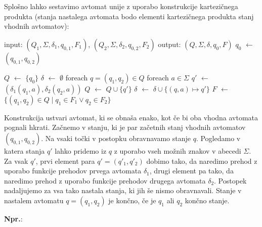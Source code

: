 \documentclass{article}
\newcommand{\Ex}{\textbf{Npr.}:\ }
\begin{document}
Splošno lahko sestavimo avtomat unije z uporabo konstrukcije kartezičnega produkta (stanja nastalega avtomata bodo elementi kartezičnega produkta stanj vhodnih avtomatov):
\begin{algorithm}
  input: $(Q_1, \Sigma, \delta_1, q_{0,1}, F_1)$, $(Q_2, \Sigma, \delta_2, q_{0,2}, F_2)$
  output: $(Q, \Sigma, \delta, q_{0}, F)$
  $q_0$ $\gets$ $(q_{0,1}, q_{0,2})$

  $Q$ $\gets$ $\{q_0\}$
  $\delta$ $\gets$ $\emptyset$
  foreach $q = (q_1, q_2) \in Q$
    foreach $a \in \Sigma$
      $q'$ $\gets$ $(\delta_1(q_1, a), \delta_2(q_2, a))$
      $Q$ $\gets$ $Q \cup \{q'\}$
      $\delta$ $\gets$ $\delta \cup \{(q, a) \mapsto q'\}$
  $F$ $\gets$ $\{(q_1, q_2) \in Q \mid q_1 \in F_1 \lor q_2 \in F_2\}$
\end{algorithm}
Konstrukcija ustvari avtomat, ki se obnaša enako, kot če bi oba vhodna avtomata pognali hkrati.
Začnemo v stanju, ki je par začetnih stanj vhodnih avtomatov $(q_{0,1}, q_{0,2})$.
Na vsaki točki v postopku obravnavamo stanje $q$.
Pogledamo v katera stanja $q'$ lahko pridemo iz $q$ z uporabo vseh možnih znakov v abecedi $\Sigma$.
Za vsak $q'$, prvi element para $q' = (q'_1, q'_2)$ dobimo tako, da naredimo prehod z uporabo funkcije prehodov prvega avtomata $\delta_1$, drugi element pa tako, da naredimo prehod z uporabo funkcije prehodov drugega avtomata $\delta_2$.
Postopek nadaljujemo za vsa tako nastala stanja, ki jih še nismo obravnavali.
Stanje v nastalem avtomatu $q = (q_1, q_2)$ je končno, če je $q_1$ ali $q_2$ končno stanje.

\Ex
\end{document}
